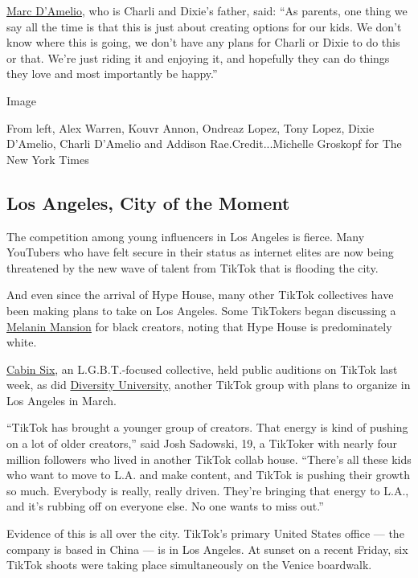 \href{https://www.instagram.com/marc.damelio/?hl=en}{Marc D'Amelio}, who
is Charli and Dixie's father, said: ``As parents, one thing we say all
the time is that this is just about creating options for our kids. We
don't know where this is going, we don't have any plans for Charli or
Dixie to do this or that. We're just riding it and enjoying it, and
hopefully they can do things they love and most importantly be happy.''

Image

From left, Alex Warren, Kouvr Annon, Ondreaz Lopez, Tony Lopez, Dixie
D'Amelio, Charli D'Amelio and Addison Rae.Credit...Michelle Groskopf for
The New York Times

\hypertarget{los-angeles-city-of-the-moment}{%
\subsection{Los Angeles, City of the
Moment}\label{los-angeles-city-of-the-moment}}

The competition among young influencers in Los Angeles is fierce. Many
YouTubers who have felt secure in their status as internet elites are
now being threatened by the new wave of talent from TikTok that is
flooding the city.

And even since the arrival of Hype House, many other TikTok collectives
have been making plans to take on Los Angeles. Some TikTokers began
discussing a \href{https://vm.tiktok.com/CP5dyo/}{Melanin Mansion} for
black creators, noting that Hype House is predominately white.

\href{https://vm.tiktok.com/CPfU4x/}{Cabin Six}, an L.G.B.T.-focused
collective, held public auditions on TikTok last week, as did
\href{https://vm.tiktok.com/CP4edb/}{Diversity University}, another
TikTok group with plans to organize in Los Angeles in March.

``TikTok has brought a younger group of creators. That energy is kind of
pushing on a lot of older creators,'' said Josh Sadowski, 19, a TikToker
with nearly four million followers who lived in another TikTok collab
house. ``There's all these kids who want to move to L.A. and make
content, and TikTok is pushing their growth so much. Everybody is
really, really driven. They're bringing that energy to L.A., and it's
rubbing off on everyone else. No one wants to miss out.''

Evidence of this is all over the city. TikTok's primary United States
office --- the company is based in China --- is in Los Angeles. At
sunset on a recent Friday, six TikTok shoots were taking place
simultaneously on the Venice boardwalk.

